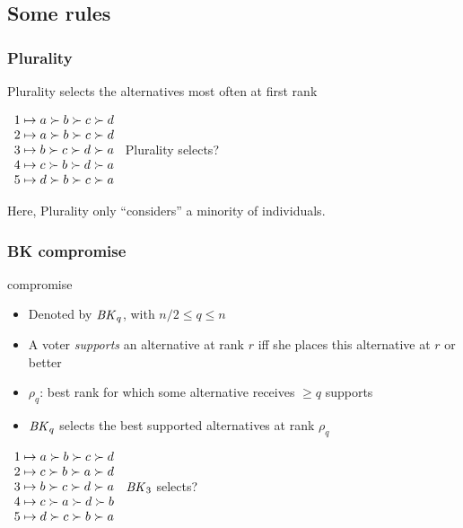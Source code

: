 \documentclass[french, english]{beamer}
\begin{document}
\subsection{Some rules}
\begin{frame}
	\frametitle{Plurality}
	Plurality selects the alternatives most often at first rank
	\begin{example}[Plurality]
		$\begin{array}{r@{\hspace{1mm} \mapsto \hspace{1mm}}l}
			1 & a \pref b \pref c \pref d\\%
			2 & a \pref b \pref c \pref d\\%
			3 & b \pref c \pref d \pref a\\%
			4 & c \pref b \pref d \pref a\\%
			5 & d \pref b \pref c \pref a\\%
		\end{array}$
		\hspace{2cm} Plurality selects? \onslide<2>{$\set{a}$}
		
		\vspace{1em}
		Here, Plurality only “considers” a minority of individuals.
	\end{example}
\end{frame}

\begin{frame}
	\frametitle{BK compromise}
	\citet{Brams2001} compromise
	\begin{itemize}
		\item Denoted by $\BK[q]$, with $n / 2 ≤ q ≤ n$
		\item A voter \emph{supports} an alternative at rank $r$ iff she places this alternative at $r$ or better
		\item $\rho_q$: best rank for which some alternative receives $≥ q$ supports
		\item $\BK$ selects the best supported alternatives at rank $\rho_q$
	\end{itemize}
	\begin{example}[{$\BK[3]$}]
		$\begin{array}{r@{\hspace{1mm} \mapsto \hspace{1mm}}l}
			1 & a \pref b \pref c \pref d\\%
			2 & c \pref b \pref a \pref d\\%
			3 & b \pref c \pref d \pref a\\%
			4 & c \pref a \pref d \pref b\\%
			5 & d \pref c \pref b \pref a\\%
		\end{array}$
		\hspace{2cm} $\BK[3]$ selects? \onslide<2>{$\set{c}$ ($\rho_3 = 2$)}
	\end{example}
\end{frame}
\end{document}
